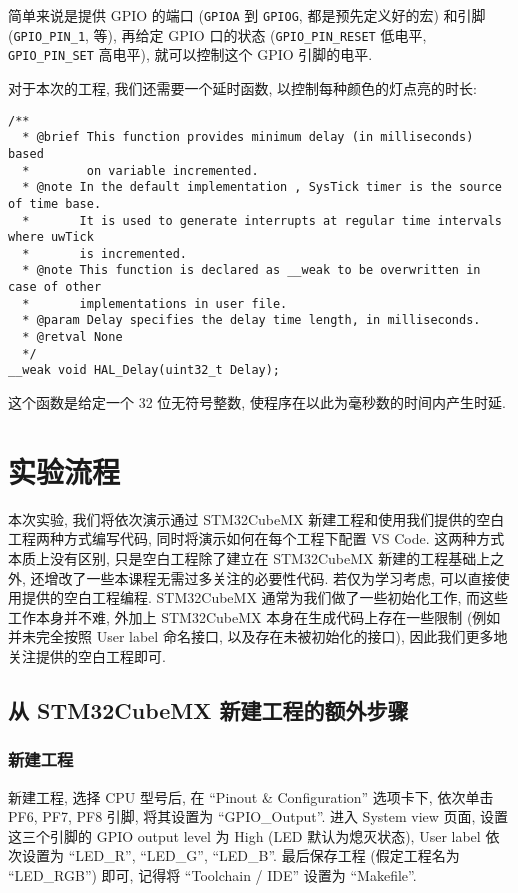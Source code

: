 简单来说是提供 GPIO 的端口 (\texttt{GPIOA} 到 \texttt{GPIOG}, 都是预先定义好的宏) 和引脚 (\texttt{GPIO\_PIN\_1}, 等), 再给定 GPIO 口的状态 (\texttt{GPIO\_PIN\_RESET} 低电平, \texttt{GPIO\_PIN\_SET} 高电平), 就可以控制这个 GPIO 引脚的电平.

对于本次的工程, 我们还需要一个延时函数, 以控制每种颜色的灯点亮的时长:

\begin{verbatim}
/**
  * @brief This function provides minimum delay (in milliseconds) based 
  *        on variable incremented.
  * @note In the default implementation , SysTick timer is the source of time base.
  *       It is used to generate interrupts at regular time intervals where uwTick
  *       is incremented.
  * @note This function is declared as __weak to be overwritten in case of other
  *       implementations in user file.
  * @param Delay specifies the delay time length, in milliseconds.
  * @retval None
  */
__weak void HAL_Delay(uint32_t Delay);
\end{verbatim}

这个函数是给定一个 32 位无符号整数, 使程序在以此为毫秒数的时间内产生时延.

\section{实验流程}
本次实验, 我们将依次演示通过 STM32CubeMX 新建工程和使用我们提供的空白工程两种方式编写代码, 同时将演示如何在每个工程下配置 VS Code. 这两种方式本质上没有区别, 只是空白工程除了建立在 STM32CubeMX 新建的工程基础上之外, 还增改了一些本课程无需过多关注的必要性代码. 若仅为学习考虑, 可以直接使用提供的空白工程编程. STM32CubeMX 通常为我们做了一些初始化工作, 而这些工作本身并不难, 外加上 STM32CubeMX 本身在生成代码上存在一些限制 (例如并未完全按照 User label 命名接口, 以及存在未被初始化的接口), 因此我们更多地关注提供的空白工程即可.

\subsection{从 STM32CubeMX 新建工程的额外步骤}
\subsubsection{新建工程}
新建工程, 选择 CPU 型号后, 在 ``Pinout \& Configuration'' 选项卡下, 依次单击 PF6, PF7, PF8 引脚, 将其设置为 ``GPIO\_Output''. 进入 System view 页面, 设置这三个引脚的 GPIO output level 为 High (LED 默认为熄灭状态), User label 依次设置为 ``LED\_R'', ``LED\_G'', ``LED\_B''. 最后保存工程 (假定工程名为 ``LED\_RGB'') 即可, 记得将 ``Toolchain / IDE'' 设置为 ``Makefile''.

